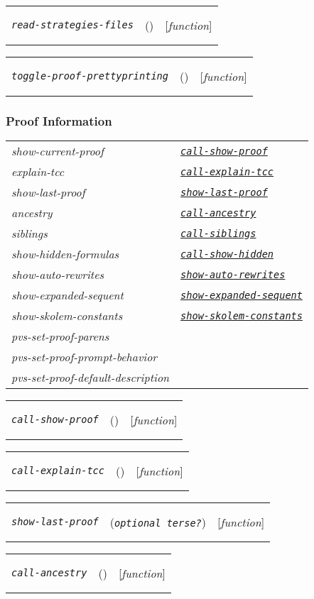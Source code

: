 \documentclass[12pt]{book}
\makeatletter
\def\ampoptional{{\smaller\sc {\smaller\smaller \&}optional\ }}
\newenvironment{function}[3]%
{\par\noindent\begin{boxedminipage}{\textwidth}%
 \par\noindent\begin{tabularx}{\linewidth}{l>{\raggedright}Xr}%
 \functionhtgt{#1}&(\texttt{\textit{#2}})&[\emph{#3}]%
 \end{tabularx}\par\flushright\begin{minipage}{.97\textwidth}}
{\end{minipage}\end{boxedminipage}}
\newcommand{\functionnm}[1]{\texttt{\textit{#1}}}
\newcommand{\functionhln}[1]{\hyperlink{#1}{\functionnm{#1}}}
\newcommand{\functionhtgt}[1]{\hypertarget{#1}{\functionnm{#1}}\index{#1@\functionnm{#1}|underline}}
\newenvironment{lispfunction}[2]%
{\begin{function}{#1}{#2}{function}}{\end{function}}
\makeatother
\begin{document}
\begin{lispfunction}{read-strategies-files}{}
\end{lispfunction}

\begin{lispfunction}{toggle-proof-prettyprinting}{}
\end{lispfunction}


\subsubsection{Proof Information}
\noindent\begin{tabularx}{\linewidth}{|>{\itshape\ttfamily}l|>{\raggedright\arraybackslash}X|}\hline
  show-current-proof & \functionhln{call-show-proof} \\
  explain-tcc & \functionhln{call-explain-tcc} \\
  show-last-proof & \functionhln{show-last-proof} \\
  ancestry & \functionhln{call-ancestry} \\
  siblings & \functionhln{call-siblings} \\
  show-hidden-formulas & \functionhln{call-show-hidden} \\
  show-auto-rewrites & \functionhln{show-auto-rewrites} \\
  show-expanded-sequent & \functionhln{show-expanded-sequent} \\
  show-skolem-constants & \functionhln{show-skolem-constants} \\
  pvs-set-proof-parens & \\
  pvs-set-proof-prompt-behavior & \\
  pvs-set-proof-default-description & \\ \hline
\end{tabularx}

\begin{lispfunction}{call-show-proof}{}
\end{lispfunction}

\begin{lispfunction}{call-explain-tcc}{}
\end{lispfunction}

\begin{lispfunction}{show-last-proof}{\ampoptional terse?}
\end{lispfunction}

\begin{lispfunction}{call-ancestry}{}
\end{lispfunction}
\end{document}
